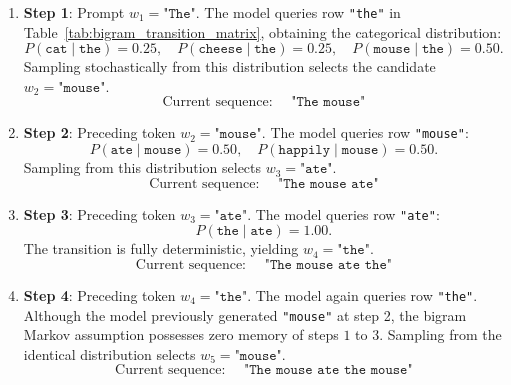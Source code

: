 \documentclass[../../../main.tex]{subfiles}
\begin{document}
\begin{enumerate}
    \item \textbf{Step 1}: Prompt $w_1 = \texttt{"The"}$. The model queries row \texttt{"the"} in Table~\ref{tab:bigram_transition_matrix}, obtaining the categorical distribution:
    \begin{equation}
    P\left(\texttt{cat} \mid \texttt{the}\right) = 0.25, \quad P\left(\texttt{cheese} \mid \texttt{the}\right) = 0.25, \quad P\left(\texttt{mouse} \mid \texttt{the}\right) = 0.50.
    \end{equation}
    Sampling stochastically from this distribution selects the candidate $w_2 = \texttt{"mouse"}$.
    \begin{equation}
    \text{Current sequence: } \quad \texttt{"The mouse"}
    \end{equation}

    \item \textbf{Step 2}: Preceding token $w_2 = \texttt{"mouse"}$. The model queries row \texttt{"mouse"}:
    \begin{equation}
    P\left(\texttt{ate} \mid \texttt{mouse}\right) = 0.50, \quad P\left(\texttt{happily} \mid \texttt{mouse}\right) = 0.50.
    \end{equation}
    Sampling from this distribution selects $w_3 = \texttt{"ate"}$.
    \begin{equation}
    \text{Current sequence: } \quad \texttt{"The mouse ate"}
    \end{equation}

    \item \textbf{Step 3}: Preceding token $w_3 = \texttt{"ate"}$. The model queries row \texttt{"ate"}:
    \begin{equation}
    P\left(\texttt{the} \mid \texttt{ate}\right) = 1.00.
    \end{equation}
    The transition is fully deterministic, yielding $w_4 = \texttt{"the"}$.
    \begin{equation}
    \text{Current sequence: } \quad \texttt{"The mouse ate the"}
    \end{equation}

    \item \textbf{Step 4}: Preceding token $w_4 = \texttt{"the"}$. The model again queries row \texttt{"the"}. Although the model previously generated \texttt{"mouse"} at step 2, the bigram Markov assumption possesses zero memory of steps $1$ to $3$. Sampling from the identical distribution selects $w_5 = \texttt{"mouse"}$.
    \begin{equation}
    \text{Current sequence: } \quad \texttt{"The mouse ate the mouse"}
    \end{equation}


\end{enumerate}
\end{document}
